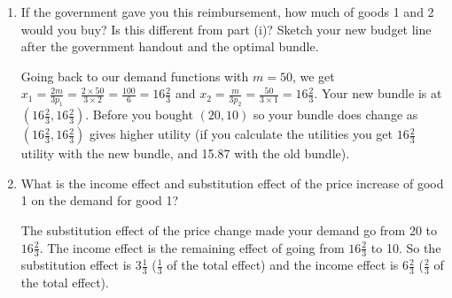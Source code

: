 \documentclass[12pt]{article}
\newcounter{question}[section]
\newenvironment{subquestions}{
  \begin{enumerate}[label=(\roman*)]}{\end{enumerate}}
\begin{document}
\begin{subquestions}
{    The vertical intercept is 50 and the horizontal intercept is 25. This is shown in the third graph below. Since $p_2=1$ and the vertical intercept is $\frac{m}{p_2}$, we know your income must be 50. Since your income was initially 30, the government would need to give you 20 to allow you to afford your initial bundle.
  }
  \item If the government gave you this reimbursement, how much of goods 1 and 2 would you buy? Is this different from part (i)? Sketch your new budget line after the government handout and the optimal bundle.
    \par\textcolor{solution-color}{
      Going back to our demand functions with $m=50$, we get $x_1=\frac{2m}{3p_1}=\frac{2\times 50}{3 \times 2} = \frac{100}{6}=16\frac{2}{3}$ and $x_2=\frac{m}{3p_2} = \frac{50}{3\times 1} = 16\frac{2}{3}$. Your new bundle is at $\left( 16\frac{2}{3},16\frac{2}{3} \right)$. Before you bought $\left( 20,10 \right)$ so your bundle does change as $\left( 16\frac{2}{3},16\frac{2}{3} \right)$ gives higher utility (if you calculate the utilities you get $16\frac{2}{3}$ utility with the new bundle, and 15.87 with the old bundle).
    }
  \item What is the income effect and substitution effect of the price increase of good 1 on the demand for good 1?
    \par\textcolor{solution-color}{
      The substitution effect of the price change made your demand go from 20 to $16\frac{2}{3}$. The income effect is the remaining effect of going from $16\frac{2}{3}$ to 10. So the substitution effect is $3\frac{1}{3}$ ($\frac{1}{3}$ of the total effect) and the income effect is $6\frac{2}{3}$ ($\frac{2}{3}$ of the total effect).
    }
\end{subquestions}
\end{document}
